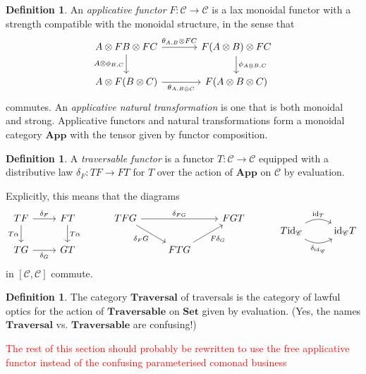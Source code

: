 \documentclass[11pt,letterpaper]{article}
\theoremstyle{plain}
\theoremstyle{definition}
\newtheorem{definition}[theorem]{Definition}
\newcommand{\C}{\mathscr{C}}
\newcommand{\Set}{\mathbf{Set}}
\newcommand{\App}{\mathbf{App}}
\newcommand{\Traversable}{\mathbf{Traversable}}
\newcommand{\Traversal}{\mathbf{Traversal}}
\newcommand{\id}{\mathrm{id}}
\newcommand{\todo}[1]{\textcolor{red}{\small #1}}
\begin{document}
\begin{definition}
An \emph{applicative functor} $F : \C \to \C$ is a lax monoidal functor with a strength compatible with the monoidal structure, in the sense that
\[
\begin{tikzcd}[column sep = large]
A \otimes FB \otimes FC \ar[r, "{\theta_{A, B} \otimes FC}"] \ar[d, swap, "{A \otimes \phi_{B, C}}"] & F(A \otimes B) \otimes FC \ar[d, "{\phi_{A \otimes B, C}}"] \\
A \otimes F(B \otimes C) \ar[r, swap, "{\theta_{A, B \otimes C}}"] & F(A \otimes B \otimes C)
\end{tikzcd}
\]
commutes. An \emph{applicative natural transformation} is one that is both monoidal and strong. Applicative functors and natural transformations form a monoidal category $\App$ with the tensor given by functor composition.
\end{definition}

\begin{definition}
A \emph{traversable functor} is a functor $T : \C \to \C$ equipped with a distributive law $\delta_F : TF \to FT$ for $T$ over the action of $\App$ on $\C$ by evaluation.

Explicitly, this means that the diagrams
\[
  \begin{tikzcd}
    TF \ar[r, "\delta_F"] \ar[d, swap, "T\alpha"] & FT \ar[d, "T\alpha"] \\
    TG \ar[r, swap, "\delta_G"] & GT
  \end{tikzcd} \hspace{1cm}
  \begin{tikzcd}
    TFG \ar[dr, swap, "\delta_F G"] \ar[rr, "\delta_{FG}"] &  & FGT \\
    & FTG \ar[ur, swap, "F \delta_G"] &
  \end{tikzcd} \hspace{1cm}
  \begin{tikzcd}
    T\id_\C \ar[r, bend left, "\id_T"] \ar[r, bend right, swap, "\delta_{\id_\C}"] & \id_\C T
  \end{tikzcd}
\]
in $[\C, \C]$ commute.
\end{definition}

\begin{definition}
The category $\Traversal$ of traversals is the category of lawful optics for the action of $\Traversable$ on $\Set$ given by evaluation. (Yes, the names $\Traversal$ vs\@. $\Traversable$ are confusing!)
\end{definition}

\todo{The rest of this section should probably be rewritten to use the free applicative functor instead of the confusing parameterised comonad business}
\end{document}
